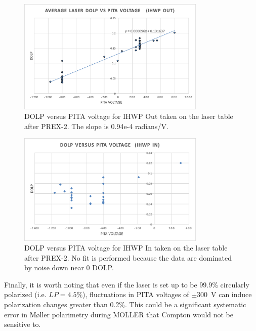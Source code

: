 \documentclass[12pt]{article}
\begin{document}
\begin{figure}
\centering
\includegraphics[width=0.8\textwidth]{DOLPvsPITA_out.png}
\caption{\label{fig:dolpvspita_out} DOLP versus PITA voltage for IHWP Out taken on the laser table after PREX-2. The slope is 0.94e-4 radians/V.}
\end{figure}
\begin{figure}
\centering
\includegraphics[width=0.8\textwidth]{DOLPvsPITA_in.png}
\caption{\label{fig:dolpvspita_in} DOLP versus PITA voltage for IHWP In taken on the laser table after PREX-2. No fit is performed because the data are dominated by noise down near 0 DOLP.}
\end{figure}

Finally, it is worth noting that even if the laser is set up to be 99.9\% circularly polarized (i.e. $LP=4.5\% $), fluctuations in PITA voltages of $\pm$300~V can induce polarization changes greater than 0.2\%. This could be a significant systematic error in M\o ller polarimetry during MOLLER that Compton would not be sensitive to.
\end{document}

